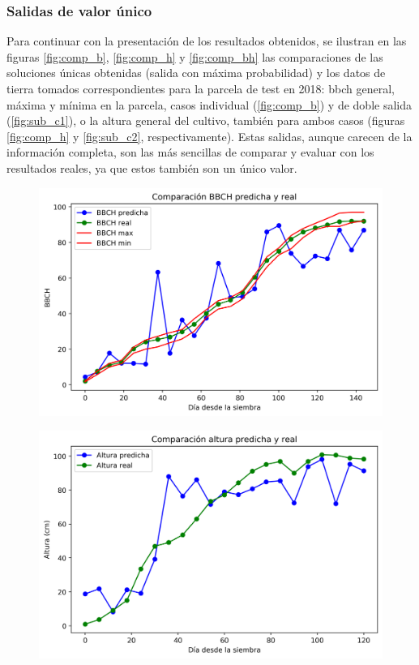 \subsubsection{Salidas de valor único}
\par Para continuar con la presentación de los resultados obtenidos, se ilustran en las figuras \ref{fig:comp_b}, \ref{fig:comp_h} y \ref{fig:comp_bh} las comparaciones de las soluciones únicas obtenidas (salida con máxima probabilidad) y los datos de tierra tomados correspondientes para la parcela de test en 2018: \gls{bbch} general, máxima y mínima en la parcela, casos individual (\ref{fig:comp_b}) y de doble salida (\ref{fig:sub_c1}), o la altura general del cultivo, también para ambos casos (figuras \ref{fig:comp_h} y \ref{fig:sub_c2}, respectivamente). Estas salidas, aunque carecen de la información completa, son las más sencillas de comparar y evaluar con los resultados reales, ya que estos también son un único valor.  

\begin{figure}[h]
\centering
\includegraphics[width=0.8\linewidth]{archivos/tfg/Mean/TEST_PARC_FINAL}
\end{figure}
\begin{figure}[h]
\centering
\includegraphics[width=0.8\linewidth]{archivos/tfg/Mean/TEST_PARC_FINAL_H}
\end{figure}

